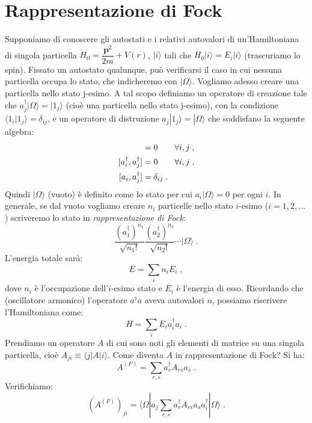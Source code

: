 \documentclass[10pt,a4paper]{report}
\theoremstyle{definition}
\numberwithin{equation}{section}
\newcommand{\bra}{\langle}
\newcommand{\ket}{\rangle}
\newcommand{\adj}[1]{#1^{\dagger}}
\begin{document}
\section{Rappresentazione di Fock}
Supponiamo di conoscere gli autostati e i relativi autovalori di un'Hamiltoniana di singola particella $H_0=\dfrac{\mathbf{p}^2}{2m}+V(r)$, $|i\ket$ tali che $H_0|i\ket=E_i|i\ket$ (trascuriamo lo spin). Fissato un autostato qualunque, può verificarsi il caso in cui nessuna particella occupa lo stato, che indicheremo con $|\Omega\ket$. Vogliamo adesso creare una particella nello stato j-esimo. A tal scopo definiamo un operatore di creazione tale che $\adj{a}_j|\Omega\ket=|1_j\ket$ (cioè una particella nello stato j-esimo), con la condizione $\bra 1_i|1_j\ket=\delta_{ij}$, e un operatore di distruzione $a_j|1_j\ket=|\Omega\ket$ che soddisfano la seguente algebra:
\begin{align}
[a_i,a_j] &= 0 \qquad \forall i,j \notag\;, \\
[\adj{a}_i,\adj{a}_j] &= 0 \qquad \forall i,j \notag\;, \\
[a_i,\adj{a}_j]&=\delta_{ij}\;.
\end{align}
Quindi $|\Omega\ket$ (vuoto) è definito come lo stato per cui $a_i|\Omega\ket=0$ per ogni $i$. In generale, se dal vuoto vogliamo creare $n_i$ particelle nello stato $i$-esimo ($i=1,2,\ldots$) scriveremo lo stato in \textit{rappresentazione di Fock}:
\begin{equation}
\frac{(\adj{a}_1)^{n_1}}{\sqrt{n_1!}}\frac{(\adj{a}_2)^{n_2}}{\sqrt{n_2!}}\cdots|\Omega\ket\;.
\end{equation}
L'energia totale sarà:
\begin{equation}
E=\sum_i n_iE_i\;,
\end{equation}
dove $n_i$ è l'occupazione dell'$i$-esimo stato e $E_i$ è l'energia di esso. Ricordando che (oscillatore armonico) l'operatore $\adj{a}a$ aveva autovalori $n$, possiamo riscrivere l'Hamiltoniana come:
\begin{equation}
H=\sum_i E_i\adj{a}_ia_i\;.
\end{equation}
Prendiamo un operatore $A$ di cui sono noti gli elementi di matrice su una singola particella, cioè $A_{ji}\equiv\bra j|A|i\ket$. Come diventa $A$ in rappresentazione di Fock? Si ha:
\begin{equation}
A^{(F)}=\sum_{r,s}\adj{a}_rA_{rs}a_s\;.
\end{equation}
Verifichiamo:
\begin{equation}
(A^{(F)})_{ji}=\bra\Omega| a_j\sum_{r,s}\adj{a}_rA_{rs}a_s\adj{a}_i|\Omega\ket\;.
\end{equation}
\end{document}
